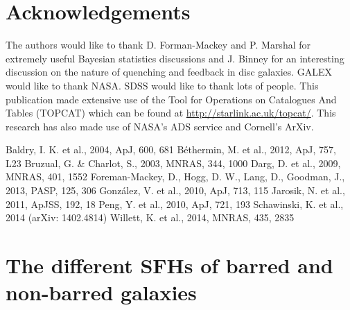 \documentclass{mn2e}
\begin{document}
\section*{Acknowledgements}
The authors would like to thank D. Forman-Mackey and P. Marshal for extremely useful Bayesian statistics discussions and J. Binney for an interesting discussion on the nature of quenching and feedback in disc galaxies. GALEX would like to thank NASA. SDSS would like to thank lots of people. This publication made extensive use of the Tool for Operations on Catalogues And Tables (TOPCAT) which can be found at \url{http://starlink.ac.uk/topcat/}. This research has also made use of NASA's ADS service and Cornell's ArXiv. 

\begin{thebibliography}{}
 Baldry, I. K. et al., 2004, ApJ, 600, 681
 B\'ethermin, M. et al., 2012, ApJ, 757, L23
 Bruzual, G. \& Charlot, S., 2003, MNRAS, 344, 1000
 Darg, D. et al., 2009, MNRAS, 401, 1552
 Foreman-Mackey, D., Hogg, D. W., Lang, D., Goodman, J., 2013, PASP, 125, 306
 Gonz\'alez, V. et al., 2010, ApJ, 713, 115
 Jarosik, N. et al., 2011, ApJSS, 192, 18
 Peng, Y. et al., 2010, ApJ, 721, 193
 Schawinski, K. et al., 2014 (arXiv: 1402.4814)
 Willett, K. et al., 2014, MNRAS, 435, 2835
\end{thebibliography}


\appendix
\section{The different SFHs of barred and non-barred galaxies}
\end{document}
